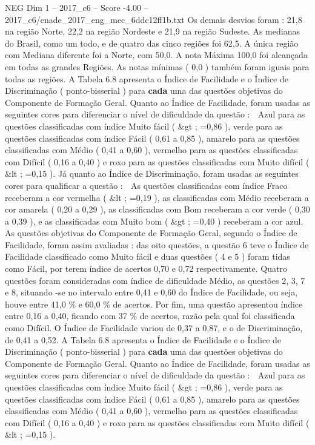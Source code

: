\begin{textsample}{NEG Dim 1 – 2017\_c6 – Score -4.00 – 2017\_c6/enade\_2017\_eng\_mec\_6ddc12ff1b.txt}
Os demais desvios foram : 21,8 na região Norte, 22,2 na região Nordeste e 21,9 na região Sudeste.
As medianas do Brasil, como um todo, e de quatro das cinco regiões foi 62,5.
A única região com Mediana diferente foi a Norte, com 50,0.
A nota Máxima 100,0 foi alcançada em todas as grandes Regiões.
As notas mínimas ( 0,0 ) também foram iguais para todas as regiões.
A Tabela 6.8 apresenta o Índice de Facilidade e o Índice de Discriminação ( ponto-bisserial ) para \textbf{cada} uma das questões objetivas do Componente de Formação Geral.
Quanto ao Índice de Facilidade, foram usadas as seguintes cores para diferenciar o nível de dificuldade da questão :  Azul para as questões classificadas com índice Muito fácil ( \&gt ; =0,86 ), verde para as questões classificadas com índice Fácil ( 0,61 a 0,85 ), amarelo para as questões classificadas com Médio ( 0,41 a 0,60 ), vermelho para as questões classificadas com Difícil ( 0,16 a 0,40 ) e roxo para as questões classificadas com Muito difícil ( \&lt ; =0,15 ).
Já quanto ao Índice de Discriminação, foram usadas as seguintes cores para qualificar a questão :  As questões classificadas com índice Fraco receberam a cor vermelha ( \&lt ; =0,19 ), as classificadas com Médio receberam a cor amarela ( 0,20 a 0,29 ), as classificadas com Bom receberam a cor verde ( 0,30 a 0,39 ), e as classificadas com Muito bom ( \&gt ; =0,40 ) receberam a cor azul.
As questões objetivas do Componente de Formação Geral, segundo o Índice de Facilidade, foram assim avaliadas : das oito questões, a questão 6 teve o Índice de Facilidade classificado como Muito fácil e duas questões ( 4 e 5 ) foram tidas como Fácil, por terem índice de acertos 0,70 e 0,72 respectivamente.
Quatro questões foram consideradas com índice de dificuldade Médio, as questões 2, 3, 7 e 8, situando -se no intervalo entre 0,41 e 0,60 do Índice de Facilidade, ou seja, houve entre 41,0 \% e 60,0 \% de acertos.
Por fim, uma questão apresentou índice entre 0,16 a 0,40, ficando com 37 \% de acertos, razão pela qual foi classificada como Difícil.
O Índice de Facilidade variou de 0,37 a 0,87, e o de Discriminação, de 0,41 a 0,52.
A Tabela 6.8 apresenta o Índice de Facilidade e o Índice de Discriminação ( ponto-bisserial ) para \textbf{cada} uma das questões objetivas do Componente de Formação Geral.
Quanto ao Índice de Facilidade, foram usadas as seguintes cores para diferenciar o nível de dificuldade da questão :  Azul para as questões classificadas com índice Muito fácil ( \&gt ; =0,86 ), verde para as questões classificadas com índice Fácil ( 0,61 a 0,85 ), amarelo para as questões classificadas com Médio ( 0,41 a 0,60 ), vermelho para as questões classificadas com Difícil ( 0,16 a 0,40 ) e roxo para as questões classificadas com Muito difícil ( \&lt ; =0,15 ).

\end{textsample}

